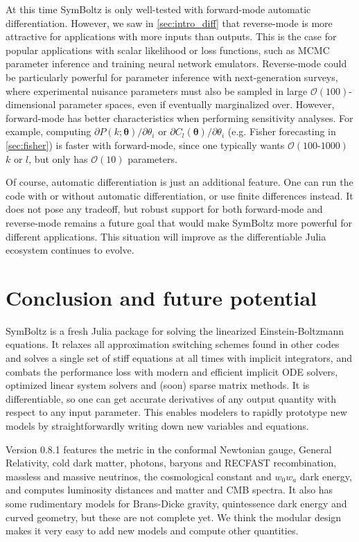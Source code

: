 \documentclass{aa}
\begin{document}
At this time SymBoltz is only well-tested with forward-mode automatic differentiation.
However, we saw in \cref{sec:intro_diff} that reverse-mode is more attractive for applications with more inputs than outputs.
This is the case for popular applications with scalar likelihood or loss functions, such as MCMC parameter inference and training neural network emulators.
Reverse-mode could be particularly powerful for parameter inference with next-generation surveys, where experimental nuisance parameters must also be sampled in large $\mathcal{O}(100)$-dimensional parameter spaces, even if eventually marginalized over.
However, forward-mode has better characteristics when performing sensitivity analyses.
For example, computing $\partial P(k; \boldsymbol{\theta})/\partial\theta_i $ or $\partial C_l(\boldsymbol{\theta}) / \partial \theta_i$
(e.g. Fisher forecasting in \cref{sec:fisher}) is faster with forward-mode, since one typically wants $\mathcal{O}(100\text{-}1000)$ $k$ or $l$, but only has $\mathcal{O}(10)$ parameters.

Of course, automatic differentiation is just an additional feature.
One can run the code with or without automatic differentiation, or use finite differences instead.
It does not pose any tradeoff, but robust support for both forward-mode and reverse-mode remains a future goal that would make SymBoltz more powerful for different applications.
This situation will improve as the differentiable Julia ecosystem continues to evolve.

\section{Conclusion and future potential}
\label{sec:conclusion}

SymBoltz is a fresh Julia package for solving the linearized Einstein-Boltzmann equations.
It relaxes all approximation switching schemes found in other codes and solves a single set of stiff equations at all times with implicit integrators, and combats the performance loss with modern and efficient implicit ODE solvers, optimized linear system solvers and (soon) sparse matrix methods.
It is differentiable, so one can get accurate derivatives of any output quantity with respect to any input parameter.
This enables modelers to rapidly prototype new models by straightforwardly writing down new variables and equations.

Version 0.8.1 features the metric in the conformal Newtonian gauge, General Relativity, cold dark matter, photons, baryons and RECFAST recombination, massless and massive neutrinos, the cosmological constant and $w_0 w_a$ dark energy, and computes luminosity distances and matter and CMB spectra.
It also has some rudimentary models for Brans-Dicke gravity, quintessence dark energy and curved geometry, but these are not complete yet.
We think the modular design makes it very easy to add new models and compute other quantities.
\end{document}
